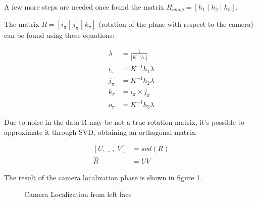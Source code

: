 \documentclass[11pt, oneside]{article}   	%
\begin{document}
A few more steps are needed once found the matrix $H_{omog} = [h_1\; |\; h_2\; |\; h_3]$. 

The matrix $R=[i_\pi\; | \; j_\pi \; | \; k_\pi]$ (rotation of the plane with respect to the camera) can be found using these equations:

\begin{subequations}
\begin{align*}
\lambda &= \frac{1}{|K^{-1}h_1|} \\
i_\pi &= K^{-1}h_1\lambda \\
j_\pi &= K^{-1}h_2\lambda \\
k_\pi &= i_\pi \times j_\pi  \\
o_\pi &= K^{-1} h_3 \lambda
\end{align*}
\end{subequations}

Due to noise in the data R may be not a true rotation matrix, it's possible to approximate it through SVD, obtaining an orthogonal matrix:

\begin{subequations}
\begin{align*}
[U,\; \_\;,\;V] &= svd(R) \\
\hat{R} &= UV
\end{align*}
\end{subequations}

The result of the camera localization phase is shown in figure \ref{left_loc}.

\begin{figure}
 \centering
    \qquad
    \qquad
    \caption{Camera Localization from left face}%
    \label{left_loc}%
\end{figure}
\end{document}
